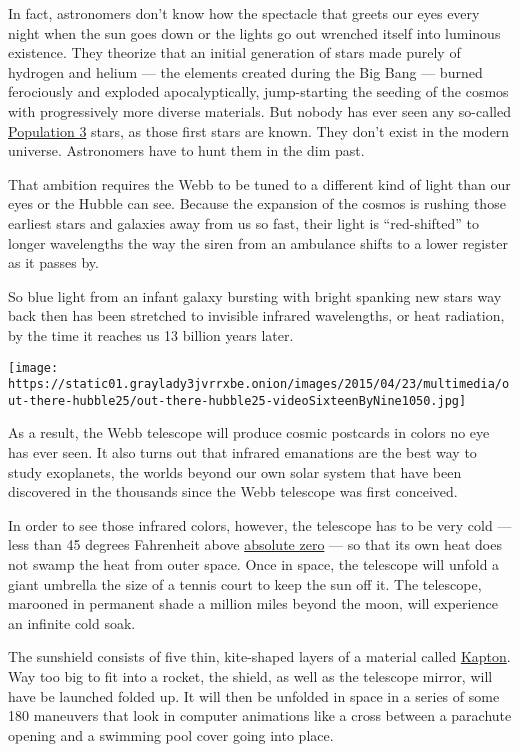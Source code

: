 In fact, astronomers don't know how the spectacle that greets our eyes
every night when the sun goes down or the lights go out wrenched itself
into luminous existence. They theorize that an initial generation of
stars made purely of hydrogen and helium --- the elements created during
the Big Bang --- burned ferociously and exploded apocalyptically,
jump-starting the seeding of the cosmos with progressively more diverse
materials. But nobody has ever seen any so-called
\href{http://astronomy.swin.edu.au/cosmos/P/Population+III}{Population
3} stars, as those first stars are known. They don't exist in the modern
universe. Astronomers have to hunt them in the dim past.

That ambition requires the Webb to be tuned to a different kind of light
than our eyes or the Hubble can see. Because the expansion of the cosmos
is rushing those earliest stars and galaxies away from us so fast, their
light is ``red-shifted'' to longer wavelengths the way the siren from an
ambulance shifts to a lower register as it passes by.

So blue light from an infant galaxy bursting with bright spanking new
stars way back then has been stretched to invisible infrared
wavelengths, or heat radiation, by the time it reaches us 13 billion
years later.

\texttt{[image: https://static01.graylady3jvrrxbe.onion/images/2015/04/23/multimedia/out-there-hubble25/out-there-hubble25-videoSixteenByNine1050.jpg]}

As a result, the Webb telescope will produce cosmic postcards in colors
no eye has ever seen. It also turns out that infrared emanations are the
best way to study exoplanets, the worlds beyond our own solar system
that have been discovered in the thousands since the Webb telescope was
first conceived.

In order to see those infrared colors, however, the telescope has to be
very cold --- less than 45 degrees Fahrenheit above
\href{https://www.sciencedaily.com/terms/absolute_zero.htm}{absolute
zero} --- so that its own heat does not swamp the heat from outer space.
Once in space, the telescope will unfold a giant umbrella the size of a
tennis court to keep the sun off it. The telescope, marooned in
permanent shade a million miles beyond the moon, will experience an
infinite cold soak.

The sunshield consists of five thin, kite-shaped layers of a material
called
\href{http://www.dupont.com/products-and-services/membranes-films/polyimide-films/brands/kapton-polyimide-film.html}{Kapton}.
Way too big to fit into a rocket, the shield, as well as the telescope
mirror, will have be launched folded up. It will then be unfolded in
space in a series of some 180 maneuvers that look in computer animations
like a cross between a parachute opening and a swimming pool cover going
into place.

